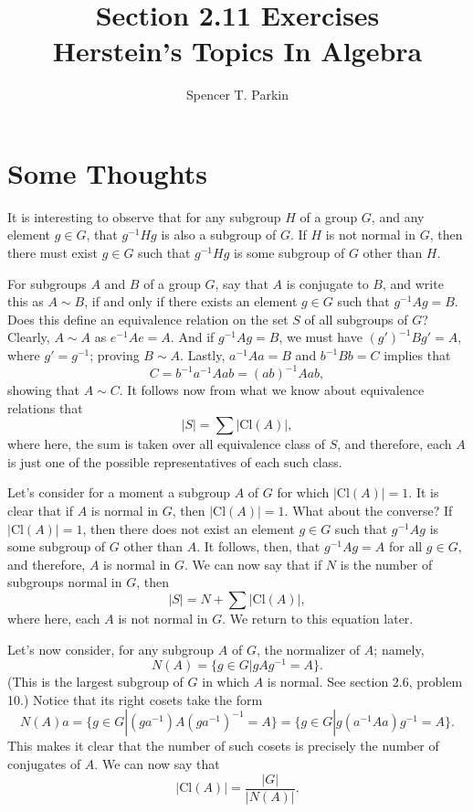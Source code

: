 \documentclass[12pt]{article}
\title{Section 2.11 Exercises\\Herstein's Topics In Algebra}
\author{Spencer T. Parkin}
\newcommand{\cl}{\mbox{Cl}}
\begin{document}
\maketitle

\section*{Some Thoughts}

It is interesting to observe that for any subgroup $H$ of a group $G$, and any element $g\in G$,
that $g^{-1}Hg$ is also a subgroup of $G$.  If $H$ is not normal in $G$, then there must exist
$g\in G$ such that $g^{-1}Hg$ is some subgroup of $G$ other than $H$.

For subgroups $A$ and $B$ of a group $G$, say that $A$ is conjugate to $B$, and write this as $A\sim B$,
if and only if there exists an element $g\in G$ such that $g^{-1}Ag=B$.  Does this define an equivalence
relation on the set $S$ of all subgroups of $G$?  Clearly, $A\sim A$ as $e^{-1}Ae=A$.
And if $g^{-1}Ag=B$, we must have $(g')^{-1}Bg'=A$, where $g'=g^{-1}$; proving $B\sim A$.
Lastly, $a^{-1}Aa=B$ and $b^{-1}Bb=C$ implies that
\begin{equation*}
C=b^{-1}a^{-1}Aab=(ab)^{-1}Aab,
\end{equation*}
showing that $A\sim C$.
It follows now from what we know about equivalence relations that
\begin{equation*}
|S|=\sum|\cl(A)|,
\end{equation*}
where here, the sum is taken over all equivalence class of $S$, and therefore,
each $A$ is just one of the possible representatives of each such class.

Let's consider for a moment a subgroup $A$ of $G$ for which $|\cl(A)|=1$.
It is clear that if $A$ is normal in $G$, then $|\cl(A)|=1$.  What about the converse?
If $|\cl(A)|=1$, then there does not exist an element $g\in G$ such that $g^{-1}Ag$
is some subgroup of $G$ other than $A$.  It follows, then, that $g^{-1}Ag=A$ for all
$g\in G$, and therefore, $A$ is normal in $G$.  We can now say that if $N$ is the
number of subgroups normal in $G$, then
\begin{equation*}
|S|=N+\sum|\cl(A)|,
\end{equation*}
where here, each $A$ is not normal in $G$.  We return to this equation later.

Let's now consider, for any subgroup $A$ of $G$, the normalizer of $A$; namely,
\begin{equation*}
N(A) = \{g\in G|gAg^{-1}=A\}.
\end{equation*}
(This is the largest subgroup of $G$ in which $A$ is normal.  See section 2.6, problem 10.)
Notice that its right cosets take the form
\begin{equation*}
N(A)a = \{g\in G|(ga^{-1})A(ga^{-1})^{-1}=A\}=\{g\in G|g(a^{-1}Aa)g^{-1}=A\}.
\end{equation*}
This makes it clear that the number of such cosets is precisely the number of conjugates of $A$.
We can now say that
\begin{equation*}
|\cl(A)|=\frac{|G|}{|N(A)|}.
\end{equation*}
\end{document}
